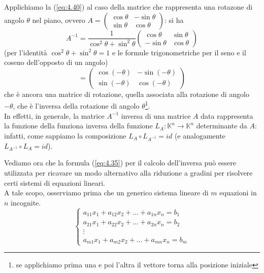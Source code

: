 \begin{esempio}
  Applichiamo la (\ref{eq:4.40}) al caso della matrice che rappresenta una rotazone di angolo $\theta$ nel piano,
  ovvero $A=
  \begin{pmatrix}
    \cos\theta&-\sin \theta\\
    \sin\theta&\cos \theta
  \end{pmatrix}
  $: si ha
  \begin{equation*}
    A^{-1}=\frac{1}{\cos^2\theta+\sin^2\theta}
  \begin{pmatrix}
    \cos\theta&\sin \theta\\
    -\sin\theta&\cos \theta
  \end{pmatrix}
\end{equation*}
(per l'identità $\cos^2\theta+\sin^2\theta=1$ e le formule trigonometriche per il seno e il coseno dell'opposto
di un angolo)
\begin{equation*}
  =
  \begin{pmatrix}
    \cos(-\theta) & -\sin(-\theta)\\
    \sin(-\theta) & \cos(-\theta)
  \end{pmatrix}
\end{equation*}
che è ancora una matrice di rotazione, quella associata alla rotazione di angolo $-\theta$, che è l'inversa della
rotazione di angolo $\theta$\footnote{se applichiamo prima una e poi l'altra il vettore torna alla posizione
  iniziale}.\\
In effetti, in generale, la matrice $A^{-1}$ inversa di una matrice $A$ data rappresenta la funzione della
funziona inversa della funzione $L_A:\mathds{K}^n\to\mathds{K}^n$ determinante da $A$: infatti, come sappiamo la
composizione $L_A\circ L_{A^{-1}}=id$ (e analogamente $L_{A^{-1}} \circ L_A=id$).
\end{esempio}
Vediamo ora che la formula (\ref{eq:4.35}) per il calcolo dell'inversa può essere utilizzata per ricavare un modo
alternativo alla riduzione a gradini per risolvere certi sistemi di equazioni lineari.\\
A tale scopo, osserviamo prima che un generico sistema lineare di $m$ equazioni in $n$ incognite.
\begin{equation}
  \label{eq:3.37}
  \begin{cases}
    a_{11}x_1+a_{12}x_2+\dots+a_{1n}x_n=b_1\\ 
    a_{21}x_1+a_{22}x_2+\dots+a_{2n}x_n=b_2\\
    \vdots\\
    a_{m1}x_1+a_{m2}x_2+\dots+a_{mn}x_n=b_m
  \end{cases}
\end{equation}
